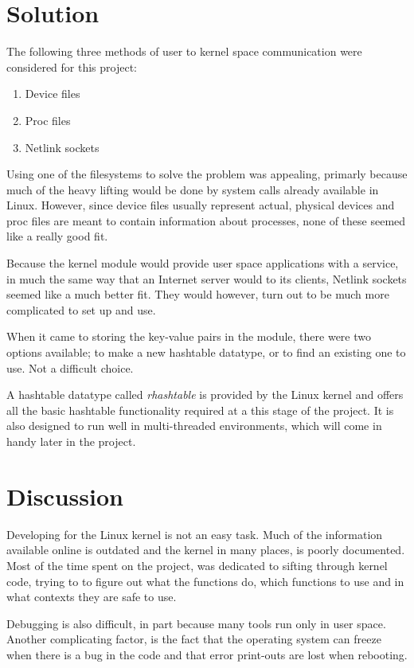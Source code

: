 \documentclass[draft,a4paper]{article}
\begin{document}
\section*{Solution}
The following three methods of user to kernel space communication were
considered for this project:
\begin{enumerate}
  \setlength\itemsep{0em}
  \item Device files
  \item Proc files
  \item Netlink sockets
\end{enumerate}
Using one of the filesystems to solve the problem was appealing, primarly
because much of the heavy lifting would be done by system calls already
available in Linux. However, since device files usually represent actual,
physical devices and proc files are meant to contain information about
processes, none of these seemed like a really good fit.

Because the kernel module would provide user space applications with a service,
in much the same way that an Internet server would to its clients, Netlink
sockets seemed like a much better fit. They would however, turn out to be much
more complicated to set up and use.

When it came to storing the key-value pairs in the module, there were two
options available; to make a new hashtable datatype, or to find an existing
one to use. Not a difficult choice.

A hashtable datatype called \emph{rhashtable} is provided by the
Linux kernel and offers all the basic hashtable functionality required
at a this stage of the project. It is also designed to run well in
multi-threaded environments, which will come in handy later in the project.

\section*{Discussion}
Developing for the Linux kernel is not an easy task. Much of the information
available online is outdated and the kernel in many places, is poorly
documented. Most of the time spent on the project, was dedicated to sifting
through kernel code, trying to to figure out what the functions do, which
functions to use and in what contexts they are safe to use.

Debugging is also difficult, in part because many tools run only in user space.
Another complicating factor, is the fact that the operating system can freeze
when there is a bug in the code and that error print-outs are lost when
rebooting.
\end{document}
